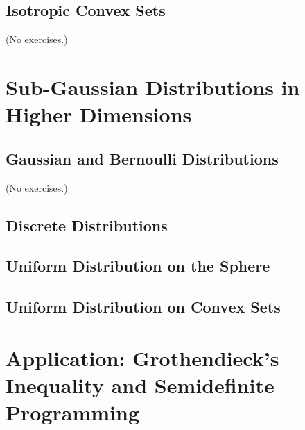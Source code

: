 \documentclass{report}
\theoremstyle{definition}
\newenvironment{exercise}[1]{
  \renewcommand\theexerciseimpl{#1}
  \exerciseimpl
}{\endexerciseimpl}
\begin{document}
\subsection{Isotropic Convex Sets}

(No exercises.)

\section{Sub-Gaussian Distributions in Higher Dimensions}

\begin{exercise}{3.4.3}
\end{exercise}

\subsection{Gaussian and Bernoulli Distributions}

(No exercises.)

\subsection{Discrete Distributions}

\begin{exercise}{3.4.4}
\end{exercise}

\begin{exercise}{3.4.5}
\end{exercise}

\subsection{Uniform Distribution on the Sphere}

\begin{exercise}{3.4.7}
\end{exercise}

\subsection{Uniform Distribution on Convex Sets}

\begin{exercise}{3.4.9}
\end{exercise}

\begin{exercise}{3.4.10}
\end{exercise}

\section{Application: Grothendieck's Inequality and Semidefinite Programming}
\end{document}
